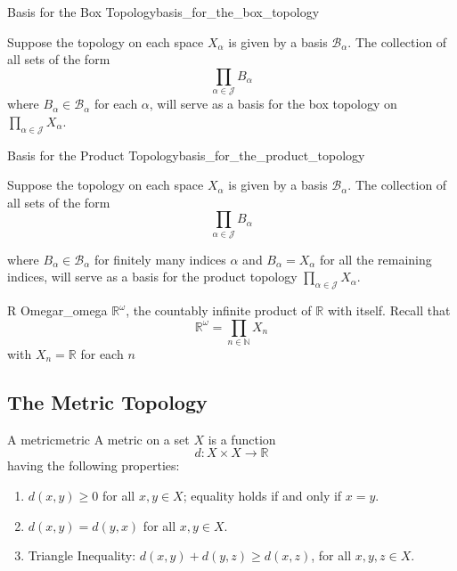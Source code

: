 

\begin{theorem}{Basis for the Box Topology}{basis_for_the_box_topology}

Suppose the topology on each space $X_{\alpha}$ is given by a basis $\mathcal{B}_{\alpha}$. The collection of all sets of the form
\[
\prod_{\alpha \in \mathcal{ J } } B_{\alpha}
\]
where $B_{\alpha} \in \mathcal{B}_{\alpha}$ for each $\alpha$, will serve as a basis for the box topology on $\prod_{\alpha \in \mathcal{ J } } X_{\alpha}$.
\end{theorem}

\begin{theorem}{Basis for the Product Topology}{basis_for_the_product_topology}

Suppose the topology on each space $X_{\alpha}$ is given by a basis $\mathcal{B}_{\alpha}$. The collection of all sets of the form
\[
\prod_{\alpha \in \mathcal{ J } } B_{\alpha}
\]

where $B_{\alpha} \in \mathcal{ B } _{\alpha}$ for finitely many indices $\alpha$ and $B_{\alpha}=X_{\alpha}$ for all the remaining indices, will serve as a basis for the product topology $\prod_{\alpha \in \mathcal{ J } } X_{\alpha}$.
\end{theorem}

\begin{definition}{R Omega}{r_omega}
$\mathbb{R}^{\omega}$, the countably infinite product of $\mathbb{R}$ with itself. Recall that
\[
    \mathbb{R}^{\omega}=\prod_{n \in \mathbb{N}} X_{n}
\]
with $ X_{ n }  =  \mathbb{R}  $ for each $ n $ 
\end{definition}


\subsection{The Metric Topology}

\begin{definition}{A metric}{metric}
A metric on a set $X$ is a function
\[
    d: X \times X \to \mathbb{R} 
\]
having the following properties:
\begin{enumerate}
       \item $d(x, y) \geq 0$ for all $x, y \in X$; equality holds if and only if $x=y$.
       \item $d(x, y)=d(y, x)$ for all $x, y \in X$.
       \item Triangle Inequality: $d(x, y)+d(y, z) \geq d(x, z)$, for all $x, y, z \in X$.
\end{enumerate}
\end{definition}


